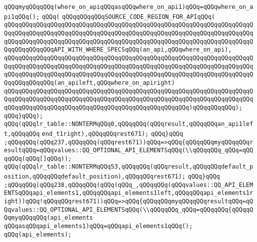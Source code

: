 \verb|qQQqmyqQQqqQQq(where_on_apiqQQqasqQQqwhere_on_api1)qQQq=qQQqwhere_on_api1qQQq();|\newline
\verb|qQQq(|\newline
\verb|qQQqqQQqqQQqSOURCE_CODE_REGION_FOR_APIqQQq(|\newline
\verb|qQQqqQQqqQQqqQQqqQQqqQQqqQQqqQQqqQQqqQQqqQQqqQQqqQQqqQQqqQQqqQQqqQQqqQQqqQQqqQQqqQQqqQQqqQQqqQQqqQQqqQQqqQQqqQQqqQQqqQQqqQQqqQQqqQQqqQQqqQQqqQQqqQQqqQQqqQQqqQQqqQQqqQQqqQQqqQQqqQQqqQQqqQQqqQQqqQQqqQQqqQQqqQQqqQQqqQQqqQQqqQQqAPI_WITH_WHERE_SPECSqQQq(an_api,qQQqwhere_on_api),|\newline
\verb|qQQqqQQqqQQqqQQqqQQqqQQqqQQqqQQqqQQqqQQqqQQqqQQqqQQqqQQqqQQqqQQqqQQqqQQqqQQqqQQqqQQqqQQqqQQqqQQqqQQqqQQqqQQqqQQqqQQqqQQqqQQqqQQqqQQqqQQqqQQqqQQqqQQqqQQqqQQqqQQqqQQqqQQqqQQqqQQqqQQqqQQqqQQqqQQqqQQqqQQqqQQqqQQqqQQqqQQqqQQqqQQq(an_apileft,qQQqwhere_on_apiright)|\newline
\verb|qQQqqQQqqQQqqQQqqQQqqQQqqQQqqQQqqQQqqQQqqQQqqQQqqQQqqQQqqQQqqQQqqQQqqQQqqQQqqQQqqQQqqQQqqQQqqQQqqQQqqQQqqQQqqQQqqQQqqQQqqQQqqQQqqQQqqQQqqQQqqQQqqQQqqQQqqQQqqQQqqQQqqQQqqQQqqQQqqQQqqQQqqQQqqQQq)qQQqqQQqqQQq);|\newline
\verb|qQQq}qQQq);|\newline
\verb|qQQq(qQQqlr_table::NONTERMqQQq0,qQQqqQQq(qQQqresult,qQQqqQQqan_api1left,qQQqqQQq|\newline
\verb|end_t1right),qQQqqQQqrest671);|\newline
\verb|qQQq}qQQq|\newline
\verb|;qQQqqQQq(qQQq237,qQQqqQQq(qQQqrest671))qQQq=>qQQq{qQQqqQQqmyqQQqqQQqresultqQQq=qQQqvalues::QQ_OPTIONAL_API_ELEMENTSqQQq(\\qQQqqQQq_qQQq=qQQqqQQq(qQQq[]qQQq));|\newline
\verb|qQQq(qQQqlr_table::NONTERMqQQq53,qQQqqQQq(qQQqresult,qQQqqQQqdefault_position,qQQqqQQqdefault_position),qQQqqQQqrest671);|\newline
\verb|qQQq}qQQq|\newline
\verb|;qQQqqQQq(qQQq238,qQQqqQQq(qQQq(qQQq_,qQQqqQQq(qQQqvalues::QQ_API_ELEMENTSqQQqapi_elements1,qQQqqQQqapi_elements1left,qQQqqQQqapi_elements1right))qQQq!qQQqqQQqrest671))qQQq=>qQQq{qQQqqQQqmyqQQqqQQqresultqQQq=qQQqvalues::QQ_OPTIONAL_API_ELEMENTSqQQq(\\qQQqqQQq_qQQq=qQQqqQQq{qQQqqQQqmyqQQqqQQq(api_elements|\newline
\verb|qQQqasqQQqapi_elements1)qQQq=qQQqapi_elements1qQQq();|\newline
\verb|qQQq(api_elements);|\newline
